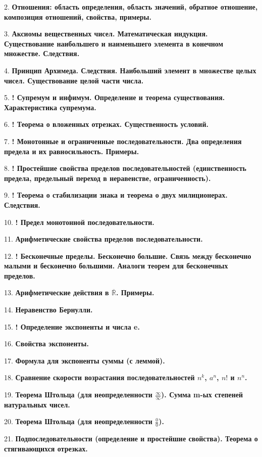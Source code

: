 \documentclass[12pt]{article}
\begin{document}
2. \textbf{Отношения: область определения, область значений, обратное отношение, композиция отношений, свойства, примеры.}

3. \textbf{Аксиомы вещественных чисел. Математическая индукция. Существование наибольшего и наименьшего элемента в конечном множестве. Следствия.}

4. \textbf{Принцип Архимеда. Следствия. Наибольший элемент в множестве целых чисел. Существование целой части числа.}

5. \textbf{! Супремум и инфимум. Определение и теорема существования. Характеристика супремума.}

6. \textbf{! Теорема о вложенных отрезках. Существенность условий.}

7. \textbf{! Монотонные и ограниченные последовательности. Два определения предела и их равносильность. Примеры.}

8. \textbf{! Простейшие свойства пределов последовательностей (единственность предела, предельный переход в неравенстве, ограниченность).}

9. \textbf{! Теорема о стабилизации знака и теорема о двух милиционерах. Следствия.}

10. \textbf{! Предел монотонной последовательности.}

11. \textbf{Арифметические свойства пределов последовательности.}

12. \textbf{! Бесконечные пределы. Бесконечно большие. Связь между бесконечно малыми и бесконечно большими. Аналоги теорем для бесконечных пределов.}

13. \textbf{Арифметические действия в $\overline{\mathbb{R}}$. Примеры.}

14. \textbf{Неравенство Бернулли.}

15. \textbf{! Определение экспоненты и числа e.}

16. \textbf{Свойства экспоненты.}

17. \textbf{Формула для экспоненты суммы (с леммой).}

18. \textbf{Сравнение скорости возрастания последовательностей $n^k$, $a^n$, $n!$ и $n^n$.}

19. \textbf{Теорема Штольца (для неопределенности $\frac{\infty}{\infty}$). Сумма m-ых степеней натуральных чисел.}

20. \textbf{Теорема Штольца (для неопределенности $\frac{0}{0}$).}

21. \textbf{Подпоследовательности (определение и простейшие свойства). Теорема о стягивающихся отрезках. }
\end{document}
